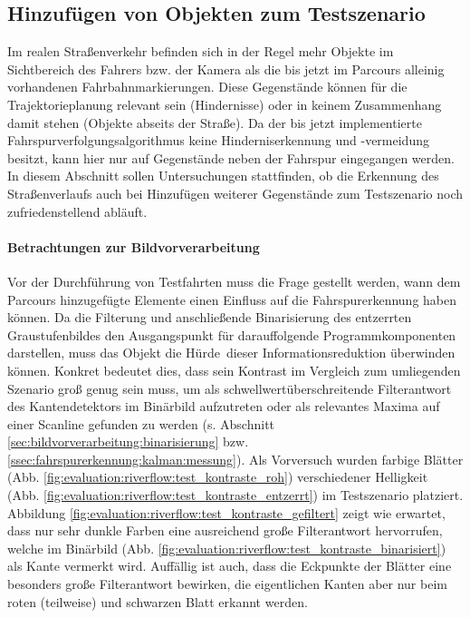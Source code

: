 \subsection{Hinzufügen von Objekten zum Testszenario \dcsecondauthorshort}
Im realen Straßenverkehr befinden sich in der Regel mehr Objekte im Sichtbereich des Fahrers bzw. der Kamera als die bis jetzt im Parcours alleinig vorhandenen Fahrbahnmarkierungen. Diese Gegenstände können für die Trajektorieplanung relevant sein (Hindernisse) oder in keinem Zusammenhang damit stehen (Objekte abseits der Straße). Da der bis jetzt implementierte Fahrspurverfolgungsalgorithmus keine Hinderniserkennung und -vermeidung besitzt, kann hier nur auf Gegenstände neben der Fahrspur eingegangen werden. In diesem Abschnitt sollen Untersuchungen stattfinden, ob die Erkennung des Straßenverlaufs auch bei Hinzufügen weiterer Gegenstände zum Testszenario noch zufriedenstellend abläuft.

\paragraph{Betrachtungen zur Bildvorverarbeitung}
\label{par:evaluation:riverflow:messungen:objekte_hinzufuegen}
Vor der Durchführung von Testfahrten muss die Frage gestellt werden, wann dem Parcours hinzugefügte Elemente einen Einfluss auf die Fahrspurerkennung haben können. Da die Filterung und anschließende Binarisierung des entzerrten Graustufenbildes den Ausgangspunkt für darauffolgende Programmkomponenten darstellen, muss das Objekt die \glqq Hürde\grqq\ dieser Informationsreduktion überwinden können. Konkret bedeutet dies, dass sein Kontrast im Vergleich zum umliegenden Szenario groß genug sein muss, um als schwellwertüberschreitende Filterantwort des Kantendetektors im Binärbild aufzutreten oder als relevantes Maxima auf einer Scanline gefunden zu werden (s. Abschnitt \ref{sec:bildvorverarbeitung:binarisierung} bzw. \ref{ssec:fahrspurerkennung:kalman:messung}).
Als Vorversuch wurden farbige Blätter (Abb. \ref{fig:evaluation:riverflow:test_kontraste_roh}) verschiedener Helligkeit (Abb. \ref{fig:evaluation:riverflow:test_kontraste_entzerrt}) im Testszenario platziert. Abbildung \ref{fig:evaluation:riverflow:test_kontraste_gefiltert} zeigt wie erwartet, dass nur sehr dunkle Farben eine ausreichend große Filterantwort hervorrufen, welche im Binärbild (Abb. \ref{fig:evaluation:riverflow:test_kontraste_binarisiert}) als Kante vermerkt wird. Auffällig ist auch, dass die Eckpunkte der Blätter eine besonders große Filterantwort bewirken, die eigentlichen Kanten aber nur beim roten (teilweise) und schwarzen Blatt erkannt werden.

